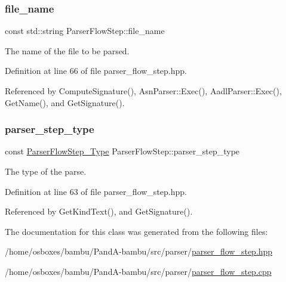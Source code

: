 \subsubsection{\texorpdfstring{file\+\_\+name}{file\_name}}
{\footnotesize\ttfamily const std\+::string Parser\+Flow\+Step\+::file\+\_\+name\hspace{0.3cm}{\ttfamily [protected]}}



The name of the file to be parsed. 



Definition at line 66 of file parser\+\_\+flow\+\_\+step.\+hpp.



Referenced by Compute\+Signature(), Asn\+Parser\+::\+Exec(), Aadl\+Parser\+::\+Exec(), Get\+Name(), and Get\+Signature().

\mbox{\label{classParserFlowStep_a69d47e5729f1d625614006fddaefc345}} 
\subsubsection{\texorpdfstring{parser\+\_\+step\+\_\+type}{parser\_step\_type}}
{\footnotesize\ttfamily const \hyperlink{parser__flow__step_8hpp_a8e093a5d7a60426e90f01aa6e6a1aa6a}{Parser\+Flow\+Step\+\_\+\+Type} Parser\+Flow\+Step\+::parser\+\_\+step\+\_\+type\hspace{0.3cm}{\ttfamily [protected]}}



The type of the parse. 



Definition at line 63 of file parser\+\_\+flow\+\_\+step.\+hpp.



Referenced by Get\+Kind\+Text(), and Get\+Signature().



The documentation for this class was generated from the following files\+:\begin{DoxyCompactItemize}
\item 
/home/osboxes/bambu/\+Pand\+A-\/bambu/src/parser/\hyperlink{parser__flow__step_8hpp}{parser\+\_\+flow\+\_\+step.\+hpp}\item 
/home/osboxes/bambu/\+Pand\+A-\/bambu/src/parser/\hyperlink{parser__flow__step_8cpp}{parser\+\_\+flow\+\_\+step.\+cpp}\end{DoxyCompactItemize}
